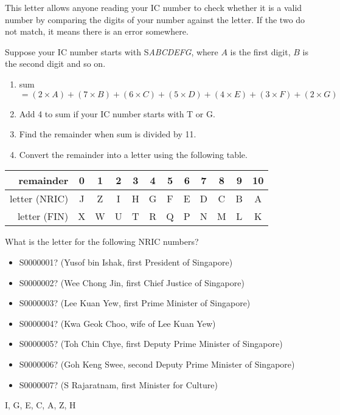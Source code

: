 \documentclass[a4paper,12pt]{article}
\begin{document}
This letter allows anyone reading your IC number to check
whether it is a valid number by comparing the digits of your number against the
letter. If the two do not match, it means there is an error somewhere.

Suppose your IC number starts with S\emph{ABCDEFG}, where $A$ is the first
digit, $B$ is the second digit and so on.
\begin{enumerate}
    \item sum $= (2 \times A) +
                 (7 \times B) +
                 (6 \times C) +
                 (5 \times D) +
                 (4 \times E) +
                 (3 \times F) +
                 (2 \times G)$
    \item Add 4 to sum if your IC number starts with T or G.
    \item Find the remainder when sum is divided by 11.
    \item Convert the remainder into a letter using the following table.
\end{enumerate}

\begin{tabular}{r||ccccccccccc}
    remainder     & 0 & 1 & 2 & 3 & 4 & 5 & 6 & 7 & 8 & 9 & 10 \\ \hline
    letter (NRIC) & J & Z & I & H & G & F & E & D & C & B & A  \\
    letter (FIN)  & X & W & U & T & R & Q & P & N & M & L & K
\end{tabular}


\begin{question}[skip-below=0\baselineskip]
What is the letter for the following NRIC numbers?
\begin{itemize}
    \item S0000001? (Yusof bin Ishak, first President of Singapore)
    \item S0000002? (Wee Chong Jin, first Chief Justice of Singapore)
    \item S0000003? (Lee Kuan Yew, first Prime Minister of Singapore)
    \item S0000004? (Kwa Geok Choo, wife of Lee Kuan Yew)
    \item S0000005? (Toh Chin Chye, first Deputy Prime Minister of Singapore)
    \item S0000006? (Goh Keng Swee, second Deputy Prime Minister of Singapore)
    \item S0000007? (S Rajaratnam, first Minister for Culture)
\end{itemize}
\end{question}
\begin{solution}
I, G, E, C, A, Z, H
\end{solution}
\end{document}
